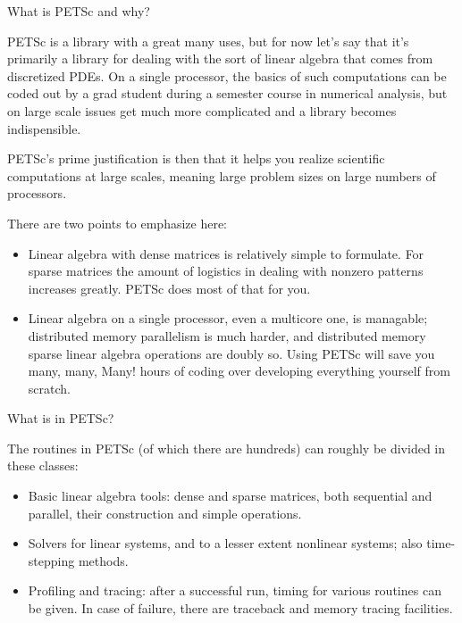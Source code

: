 
 {What is PETSc and why?}

PETSc is a library with a great many uses, but for now let's say that
it's primarily a library for dealing with the sort of linear algebra
that comes from discretized \acp{PDE}. On a single processor, the
basics of such computations 
can be coded out by a grad student during a semester
course in numerical analysis, but on large scale issues get much more
complicated and a library becomes indispensible.

PETSc's prime justification is then that it helps you realize
scientific computations at large scales, meaning large problem sizes
on large numbers of processors.

There are two points to emphasize here:
\begin{itemize}
\item Linear algebra with dense matrices is relatively simple to
  formulate. For sparse matrices the amount of logistics in dealing
  with nonzero patterns increases greatly. PETSc does most of that for
  you.
\item Linear algebra on a single processor, even a multicore one, is
  managable; distributed memory parallelism is much harder, and
  distributed memory sparse linear algebra operations are doubly
  so. Using PETSc will save you many, many, Many! hours of coding over
  developing everything yourself from scratch.
\end{itemize}

 {What is in PETSc?}

The routines in PETSc (of which there are hundreds) can roughly be
divided in these classes:
\begin{itemize}
\item Basic linear algebra tools: dense and sparse matrices, both
  sequential and parallel, their construction and simple operations.
\item Solvers for linear systems, and to a lesser extent nonlinear
  systems; also time-stepping methods.
\item Profiling and tracing: after a successful run, timing for
  various routines can be given. In case of failure, there are
  traceback and memory tracing facilities.
\end{itemize}

